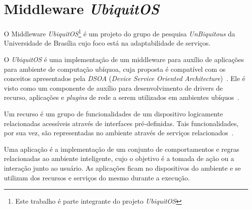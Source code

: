 \section{Middleware \textit{UbiquitOS}}

	O Middleware \textit{UbiquitOS}\footnote{Este trabalho é parte integrante do projeto \textit{UbiquitOS}} é um projeto do grupo de pesquisa \textit{UnBiquitous} da Universidade de Brasília cujo foco está na adaptabilidade de serviços.

	O \textit{UbiquitOS} é uma implementação de um middleware para auxílio de aplicações para ambiente de computação ubíquoa, cuja proposta é compatível com os conceitos apresentados pela \textit{DSOA} (\textit{Device Service Oriented Architecture})~\cite{fabriciobuzzeto}. Ele é visto como um componente de auxílio para desenvolvimento de drivers de recurso, aplicações e \textit{plugins} de rede a serem utilizados em ambientes ubíquos~\cite{fabriciobuzzeto}.

	Um recurso é um grupo de funcionalidades de um dispositivo logicamente relacionadas acessíveis através de interfaces pré-definidas. Tais funcionalidades, por sua vez, são representadas no ambiente através de serviços relacionados~\cite{fabriciobuzzeto}.

	Uma aplicação é a implementação de um conjunto de comportamentos e regras relacionadas ao ambiente inteligente, cujo o objetivo é a tomada de ação ou a interação junto ao usuário. As aplicações ficam no dispositivos do ambiente e se utilizam dos recursos e serviços do mesmo durante a execução.

